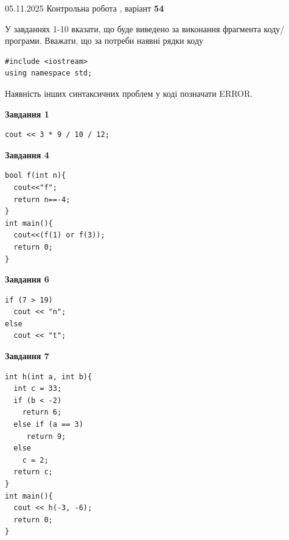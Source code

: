 \documentclass[12pt, ukrainian]{article}
\begin{document}
{\Large{05.11.2025 Контрольна робота , варіант  \No \textbf { 54 }\par}}
{
\begin {large}
У завданнях 1-10 вказати, що буде виведено за виконання фрагмента коду/про\-гра\-ми.
Вважати, що за потреби наявні рядки коду
\begin{verbatim}
#include <iostream>
using namespace std;
\end{verbatim}
Наявність інших синтаксичних проблем у коді позначати ERROR.

\begin{minipage}[t]{7.0cm}

\begin{center}
\textbf{Завдання 1}
\end{center}
\vspace{-8mm}

\begin{verbatim}
cout << 3 * 9 / 10 / 12;
\end{verbatim}



\begin{center}
\textbf{Завдання 4}
\end{center}
\vspace{-8mm}

\begin{verbatim}
bool f(int n){
  cout<<"f";
  return n==-4;
}
int main(){
  cout<<(f(1) or f(3));
  return 0;
}
\end{verbatim}



\begin{center}
\textbf{Завдання 6}
\end{center}
\vspace{-8mm}

\begin{verbatim}
if (7 > 19)
  cout << "n";
else
  cout << "t";
\end{verbatim}



\begin{center}
\textbf{Завдання 7}
\end{center}
\vspace{-8mm}

\begin{verbatim}
int h(int a, int b){
  int c = 33;
  if (b < -2)
    return 6;
  else if (a == 3)
     return 9;
  else
    c = 2;
  return c;
}
int main(){
  cout << h(-3, -6);
  return 0;
}
\end{verbatim}


\end{minipage}
\end{large}}
\end{document}
